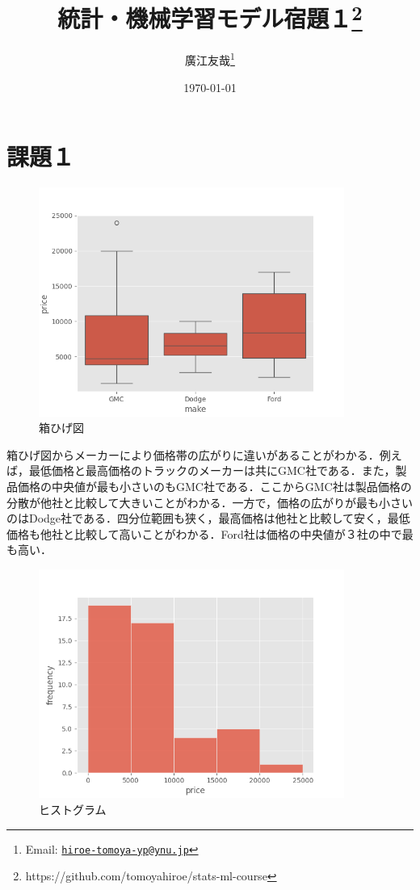 \documentclass[article]{jlreq}
\title{統計・機械学習モデル宿題１\footnote{https://github.com/tomoyahiroe/stats-ml-course}}
\author{廣江友哉\;2125178\thanks{Email: \texttt{\href{hiroe-tomoya-yp@ynu.jp}{hiroe-tomoya-yp@ynu.jp}}}}
\date{\today}
\begin{document}
\maketitle

\tableofcontents



\section{課題１}

\begin{figure}[H]
  \centering
  \includegraphics[width=100mm]{../plots/hw1/boxplot.png}
  \caption{箱ひげ図}
\end{figure}

箱ひげ図からメーカーにより価格帯の広がりに違いがあることがわかる．例えば，最低価格と最高価格のトラックのメーカーは共にGMC社である．また，製品価格の中央値が最も小さいのもGMC社である．ここからGMC社は製品価格の分散が他社と比較して大きいことがわかる．一方で，価格の広がりが最も小さいのはDodge社である．四分位範囲も狭く，最高価格は他社と比較して安く，最低価格も他社と比較して高いことがわかる．Ford社は価格の中央値が３社の中で最も高い．

\begin{figure}[H]
  \centering
  \includegraphics[width=100mm]{../plots/hw1/histogram.png}
  \caption{ヒストグラム}
\end{figure}
\end{document}
